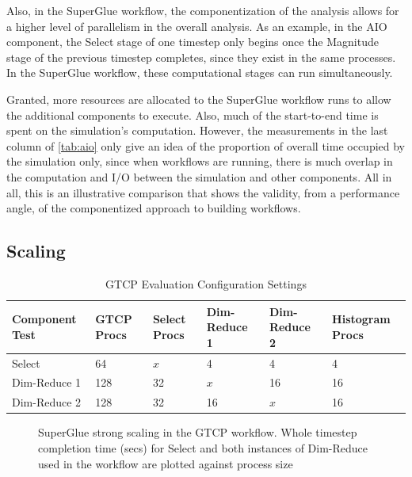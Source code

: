 Also, in the SuperGlue workflow,
the componentization of the analysis
allows for a higher level of parallelism in the overall
analysis. As an example, in the AIO component,
the Select stage of one timestep
only begins once the Magnitude
stage of the previous timestep
completes, since they exist in the same processes.
In the SuperGlue workflow, these
computational stages can run simultaneously.

Granted, more resources are allocated to the
SuperGlue workflow runs to allow the additional
components to execute.
Also, much of the start-to-end time is spent on
the simulation's computation.
However, the measurements in the last column
of \autoref{tab:aio}
only give an idea of the proportion of 
overall time occupied by the simulation only,
since when workflows are running, there is much
overlap in the computation and I/O between the
simulation and other components.
All in all, this is
an illustrative comparison that shows the validity,
from a performance angle,
of the componentized approach
to building workflows.

\subsection{Scaling}

\begin{table}[tbp]
  \centering
  \caption{GTCP Evaluation Configuration Settings}
  \label{tab:eval-strong-gtcp}
  \vspace{-0.05in}
  \begin{tabular}{|l|l|l|l|l|l|}
    \hline
    Component Test & GTCP Procs & Select Procs & Dim-Reduce 1 & Dim-Reduce 2 & Histogram Procs \\
    \hline
    Select & 64 & $x$ & 4 & 4 & 4\\
    \hline
    Dim-Reduce 1 & 128 & 32 & $x$ & 16 & 16\\
    \hline
    Dim-Reduce 2 & 128 & 32 & 16 & $x$ & 16\\
    \hline
  \end{tabular}
  \vspace{-0.07in}
\end{table}

\begin{figure}
  \centering
  
  
  \caption{SuperGlue strong scaling in the GTCP workflow. Whole timestep
    completion time (secs) for Select and both instances of Dim-Reduce used in
    the workflow are plotted against process size}
  \label{fig:gtcp-strong}
  \vspace{-0.25in}
\end{figure}

